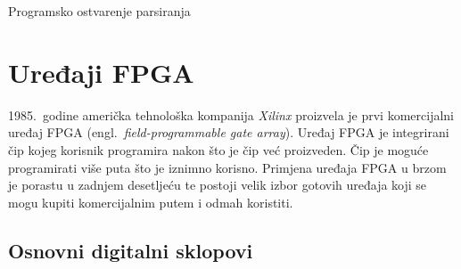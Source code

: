 \documentclass[times, utf8, diplomski]{fer}
\begin{document}
\begin{algorithm}
	\caption{Programsko ostvarenje parsiranja}
\end{algorithm}


\section{Uređaji FPGA} \label{sec:fpga}

1985.~godine američka tehnološka kompanija \textit{Xilinx} proizvela je prvi komercijalni uređaj FPGA (engl.~\textit{field-programmable gate array}). Uređaj FPGA je integrirani čip kojeg korisnik programira nakon što je čip već proizveden. Čip je moguće programirati više puta što je iznimno korisno. Primjena uređaja FPGA u brzom je porastu u zadnjem desetljeću te postoji velik izbor gotovih uređaja koji se mogu kupiti komercijalnim putem i odmah koristiti.

\subsection{Osnovni digitalni sklopovi}
\end{document}
